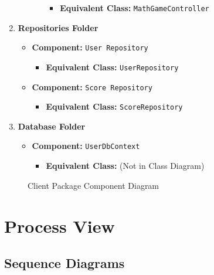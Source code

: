 \documentclass[11pt,a4paper]{article}
\newcommand{\inputdiagram}[1]{}
\newcommand{\textwidthdiagram}[2][1]{%
  \resizebox{#1\textwidth}{!}{\inputdiagram{#2}}%
}
\begin{document}
\begin{enumerate}[label=\textbf{\arabic*.}, ref=\arabic*]
\begin{enumerate}[label=\textbf{\alph*.}, ref=\theenumi.\alph*]
\begin{itemize}
                        \begin{itemize}
                            \item \textbf{Equivalent Class:} \texttt{MathGameController}
                        \end{itemize}
                \end{itemize}
        \end{enumerate}
    \item \textbf{Repositories Folder}
        \begin{itemize}
            \item \textbf{Component:} \texttt{User Repository}
                \begin{itemize}
                    \item \textbf{Equivalent Class:} \texttt{UserRepository}
                \end{itemize}
            \item \textbf{Component:} \texttt{Score Repository}
                \begin{itemize}
                    \item \textbf{Equivalent Class:} \texttt{ScoreRepository}
                \end{itemize}
        \end{itemize}
    \item \textbf{Database Folder}
        \begin{itemize}
            \item \textbf{Component:} \texttt{UserDbContext}
                \begin{itemize}
                    \item \textbf{Equivalent Class:} (Not in Class Diagram)
                \end{itemize}
        \end{itemize}
\end{enumerate}



\begin{figure}[H]
    \centering
    \textwidthdiagram{client_components.tex}
    \caption{Client Package Component Diagram}
    \label{fig:client_components}
\end{figure}

\section{Process View}

\subsection{Sequence Diagrams}
\end{document}
